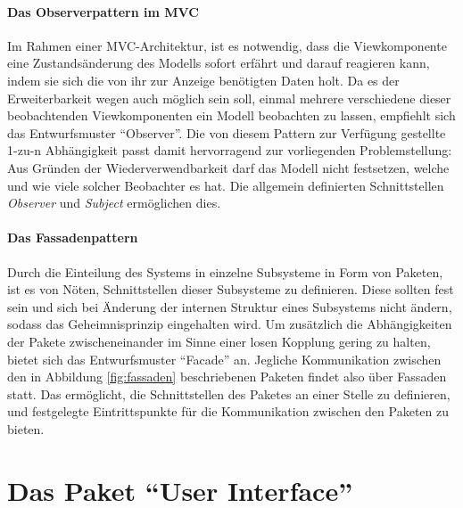 \documentclass[parskip=full]{scrartcl}
\begin{document}
\paragraph{Das Observerpattern im MVC}
Im Rahmen einer MVC-Architektur, ist es notwendig, dass die Viewkomponente eine Zustandsänderung des Modells sofort erfährt und darauf reagieren kann, indem sie sich die von ihr zur Anzeige benötigten Daten holt. Da es der Erweiterbarkeit wegen auch möglich sein soll, einmal mehrere verschiedene dieser beobachtenden Viewkomponenten ein Modell beobachten zu lassen, empfiehlt sich das Entwurfsmuster \enquote{Observer}. Die von diesem Pattern zur Verfügung gestellte 1-zu-n Abhängigkeit passt damit hervorragend zur vorliegenden Problemstellung: Aus Gründen der Wiederverwendbarkeit darf das Modell nicht festsetzen, welche und wie viele solcher Beobachter es hat. Die allgemein definierten Schnittstellen \textit{Observer} und \textit{Subject} ermöglichen dies. 
\paragraph{Das Fassadenpattern}
Durch die Einteilung des Systems in einzelne Subsysteme in Form von Paketen, ist es von Nöten, Schnittstellen dieser Subsysteme zu definieren. Diese sollten fest sein und sich bei Änderung der internen Struktur eines Subsystems nicht ändern, sodass das Geheimnisprinzip eingehalten wird. Um zusätzlich die Abhängigkeiten der Pakete zwischeneinander im Sinne einer losen Kopplung gering zu halten, bietet sich das Entwurfsmuster \enquote{Facade} an. Jegliche Kommunikation zwischen den in Abbildung \ref{fig:fassaden} beschriebenen Paketen findet also über Fassaden statt. Das ermöglicht, die Schnittstellen des Paketes an einer Stelle zu definieren, und festgelegte Eintrittspunkte für die Kommunikation zwischen den Paketen zu bieten.


\newpage
\section{Das Paket \enquote{User Interface}}
\label{UI}
\end{document}
